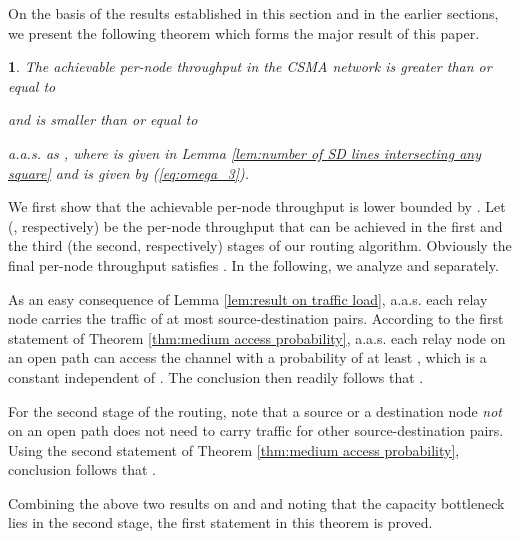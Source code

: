 \documentclass[english]{IEEEtran}
\theoremstyle{plain}
\newtheorem{thm}{\protect\theoremname}
\theoremstyle{plain}
\theoremstyle{plain}
\theoremstyle{remark}
\providecommand{\theoremname}{Theorem}
\begin{document}
On the basis of the results established in this section and in the
earlier sections, we present the following theorem which forms the
major result of this paper. 
\begin{thm}
\textbf{\label{thm:Throughput-lower-bound}}The achievable per-node
throughput in the CSMA network is greater than or equal to 



and is smaller than or equal to 

a.a.s. as , where  is given in Lemma
\ref{lem:number of SD lines intersecting any square} and 
is given by (\ref{eq:omega_3}).\end{thm}
\begin{IEEEproof}
We first show that the achievable per-node throughput is lower bounded
by . Let 
(, respectively) be the per-node throughput
that can be achieved in the first and the third (the second, respectively)
stages of our routing algorithm. Obviously the final per-node throughput
 satisfies .
In the following, we analyze  and 
separately.

As an easy consequence of Lemma \ref{lem:result on traffic load},
a.a.s. each relay node carries the traffic of at most 
source-destination pairs. According to the first statement of Theorem
\ref{thm:medium access probability}, a.a.s. each relay node on an
open path can access the channel with a probability of at least ,
which is a constant independent of . The conclusion then readily
follows that .

For the second stage of the routing, note that a source or a destination
node \emph{not} on an open path does not need to carry traffic for
other source-destination pairs. Using the second statement of Theorem
\ref{thm:medium access probability}, conclusion follows that .

Combining the above two results on  and
 and noting that the capacity bottleneck
lies in the second stage, the first statement in this theorem is proved.


\end{IEEEproof}
\end{document}
